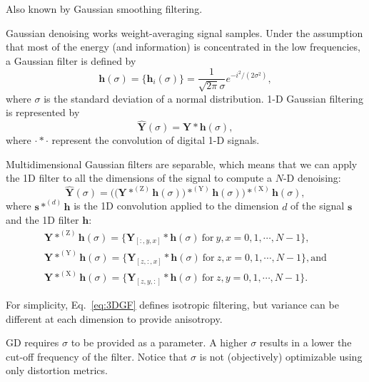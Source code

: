 \documentclass{article}
\begin{document}
Also known by Gaussian smoothing filtering.

Gaussian denoising works weight-averaging signal samples. Under the
assumption that most of the energy (and information) is concentrated
in the low frequencies, a Gaussian filter is defined by
\begin{equation}
  \mathbf{h}(\sigma) = \{\mathbf{h}_i(\sigma)\} = \frac{1}{\sqrt{2\pi}\sigma}e^{{-i}^2/(2\sigma^2)},
\end{equation}
where $\sigma$ is the standard deviation of a normal
distribution. 1-D Gaussian filtering is represented by
\begin{equation}
  \hat{\mathbf{Y}}(\sigma) = \mathbf{Y}*\mathbf{h}(\sigma),
  \label{eq:GF}
\end{equation}
where $\cdot*\cdot$ represent the convolution of digital 1-D signals.

Multidimensional Gaussian filters are separable, which means that we
can apply the 1D filter to all the dimensions of the signal to compute
a $N$-D denoising:
\begin{equation}
  \hat{\mathbf{Y}}(\sigma) = \Big(\big({\mathbf Y}*^{(\text{Z})}{\mathbf h}(\sigma)\big)*^{(\text{Y})}{\mathbf h}(\sigma)\Big)*^{(\text{X})}{\mathbf h}(\sigma),
    \label{eq:3DGF}
\end{equation}
where ${\mathbf s}*^{(d)}{\mathbf h}$ is the 1D convolution applied to
the dimension $d$ of the signal ${\mathbf s}$ and the 1D filter
${\mathbf h}$:
\begin{equation*}
    \begin{array}{l}
    \mathbf{Y}*^{(\text{Z})}{\mathbf h}(\sigma)=\{{\mathbf Y}_{[:,y,x]}*{\mathbf h}(\sigma)~\text{for}~y,x=0,1,\cdots,N-1\},\\
    \mathbf{Y}*^{(\text{Y})}{\mathbf h}(\sigma)=\{{\mathbf Y}_{[z,:,x]}*{\mathbf h}(\sigma)~\text{for}~z,x=0,1,\cdots,N-1\}, \text{and}\\
    \mathbf{Y}*^{(\text{X})}{\mathbf h}(\sigma)=\{{\mathbf Y}_{[z,y,:]}*{\mathbf h}(\sigma)~\text{for}~z,y=0,1,\cdots,N-1\}.
    \end{array}
\end{equation*}

For simplicity, Eq.~\ref{eq:3DGF} defines isotropic
filtering, but variance can be different at each dimension to
provide anisotropy.

GD requires $\sigma$ to be provided as a parameter. A higher $\sigma$
results in a lower the cut-off frequency of the filter. Notice that
$\sigma$ is not (objectively) optimizable using only distortion 
metrics.
\end{document}
